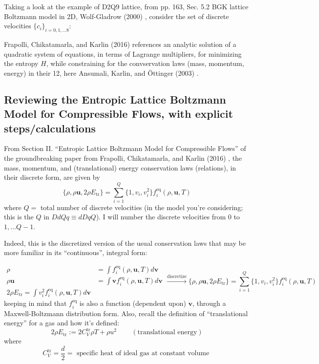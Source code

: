 \documentclass[twoside,landscape,10pt]{amsart}
\theoremstyle{plain}
\theoremstyle{definition}
\theoremstyle{remark}
\theoremstyle{remark}
\begin{document}
\begin{multicols*}{2}
Taking a look at the example of D2Q9 lattice, from pp. 163, Sec. 5.2 BGK lattice Boltzmann model in 2D, Wolf-Gladrow (2000) \cite{DWol2000}, consider the set of discrete velocities $\lbrace c_i \rbrace_{i=0,1,\dots 8}$:





Frapolli, Chikatamarla, and Karlin (2016) \cite{FCK2016} references an analytic solution of a quadratic system of equations, in terms of Lagrange multipliers, for minimizing the entropy $H$, while constraining for the convservation laws (mass, momentum, energy) in their 12, here Ansumali, Karlin, and \"{O}ttinger (2003) \cite{AKO2003}.


\subsection{Reviewing the Entropic Lattice Boltzmann Model for Compressible Flows, with explicit steps/calculations}

From Section II. ``Entropic Lattice Boltzmann Model for Compressible Flows'' of the groundbreaking paper from Frapolli, Chikatamarla, and Karlin (2016) \cite{FCK2016}, the mass, momentum, and (translational) energy conservation laws (relations), in their discrete form, are given by
\begin{equation}
  \lbrace \rho, \rho\mathbf{u}, 2\rho E_{\text{tr}} \rbrace = \sum_{i=1}^Q \lbrace 1, v_i, v_i^2 \rbrace f_i^{\text{eq}}(\rho, \mathbf{u}, T)
  \end{equation}
where $Q = $ total number of discrete velocities (in the model you're considering; this is the $Q$ in $DdQq\equiv dDqQ$).  I will number the discrete velocities from $0$ to $1,\dots Q-1$.  

Indeed, this is the discretized version of the usual conservation laws that may be more familiar in its ``continuous'', integral form:

\[
\begin{aligned}
  \rho & = \int f_i^{\text{eq}}(\rho,\mathbf{u},T) d\mathbf{v} \\ 
  \rho \mathbf{u} & = \int \mathbf{v} f_i^{\text{eq}}(\rho,\mathbf{u},T) d\mathbf{v} \\
  2\rho E_{\text{tr}} = \int v_i^2 f_i^{\text{eq}}(\rho,\mathbf{u},T) d\mathbf{v}
  \end{aligned} \xrightarrow{\text{discretize}}   \lbrace \rho, \rho\mathbf{u}, 2\rho E_{\text{tr}} \rbrace = \sum_{i=1}^Q \lbrace 1, v_i, v_i^2 \rbrace f_i^{\text{eq}}(\rho, \mathbf{u}, T)
\]
keeping in mind that $f_i^{\text{eq}}$ is also a function (dependent upon) $\mathbf{v}$, through a Maxwell-Boltzmann distribution form.  Also, recall the definition of ``translational energy'' for a gas and how it's defined:
\begin{equation}
  2\rho E_{\text{tr}} := 2C_V^{\text{tr}} \rho T + \rho u^2 \qquad \, (\text{translational energy})
\end{equation}
where
\begin{equation}
  C_V^{\text{tr}} = \frac{d}{2} = \text{ specific heat of ideal gas at constant volume }
\end{equation}


\end{multicols*}
\end{document}
